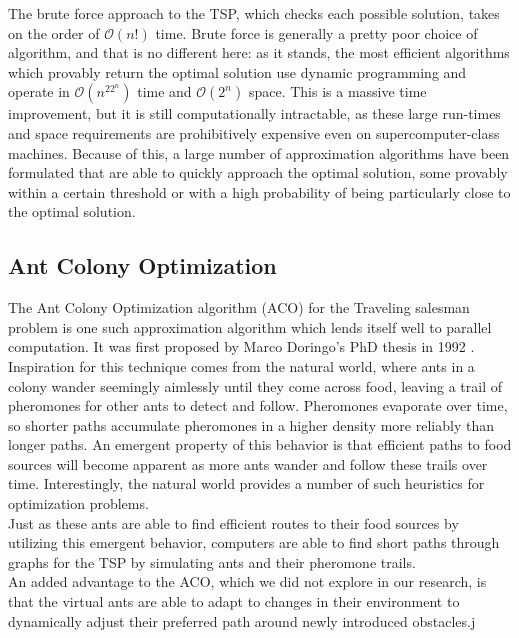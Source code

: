 \documentclass[twocolumn]{article}
\begin{document}
The brute force approach to the TSP, which checks each possible solution, takes 
on the order of $\mathcal{O}(n!)$ time. Brute force is generally a pretty poor choice of
algorithm, and that is no different here: as it stands, the most efficient 
algorithms which provably return the optimal solution use dynamic
programming and operate in $\mathcal{O}(n^22^n)$ time and $\mathcal{O}(2^n)$ space. 
This is a massive time improvement, but it is still computationally intractable, as 
these large run-times and space requirements are prohibitively expensive even on 
supercomputer-class machines. Because of this, a large number of approximation 
algorithms have been formulated that are able to quickly approach the optimal 
solution, some provably within a certain threshold or with a high probability of
being particularly close to the optimal solution. 

\subsection{Ant Colony Optimization} 

The Ant Colony Optimization algorithm (ACO) for the Traveling salesman problem 
is one such approximation algorithm which lends itself well to parallel 
computation. It was first proposed by Marco Doringo's PhD thesis in 1992 \cite{dorigo}. 
Inspiration for this technique comes from the natural world, where ants in a
colony wander seemingly aimlessly until they come across food, leaving
a trail of pheromones for other ants to detect and follow. Pheromones
evaporate over time, so shorter paths accumulate pheromones in a higher density 
more reliably than longer paths. An emergent property of this behavior is that 
efficient paths to food sources will become apparent as more ants wander and 
follow these trails over time. Interestingly, the natural world provides a number
of such heuristics for optimization problems. \\

Just as these ants are able to find efficient routes to their food sources by
utilizing this emergent behavior, computers are able to find short paths through
graphs for the TSP by simulating ants and their pheromone trails. \\

An added advantage to the ACO, which we did not explore in our research, is that
the virtual ants are able to adapt to changes in their environment to 
dynamically adjust their preferred path around newly introduced obstacles.j %
\end{document}
